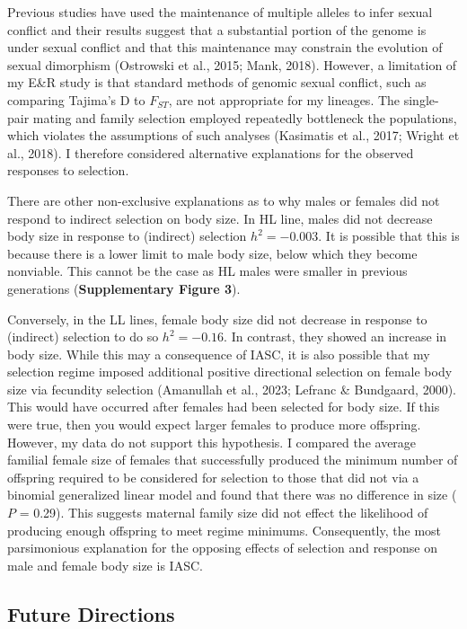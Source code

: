 \documentclass[12pt,reqno,oneside]{report}
\begin{document}
Previous studies have used the maintenance of multiple alleles to infer sexual conflict and their results suggest that a substantial portion of the genome is under sexual conflict and that this maintenance may constrain the evolution of sexual dimorphism (Ostrowski et al., 2015; Mank, 2018). However, a limitation of my E\&R study is that standard methods of genomic sexual conflict, such as comparing Tajima's D to \(F_{ST}\), are not appropriate for my lineages. The single-pair mating and family selection employed repeatedly bottleneck the populations, which violates the assumptions of such analyses (Kasimatis et al., 2017; Wright et al., 2018). I therefore considered alternative explanations for the observed responses to selection.

There are other non-exclusive explanations as to why males or females  did not respond to indirect selection on body size. In HL line, males did not decrease body size in response to (indirect) selection \(h^2 = -0.003\). It is possible that this is because there is a lower limit to male body size, below which they become nonviable. This cannot be the case as HL males were smaller in previous generations (\textbf{Supplementary Figure 3}).

Conversely, in the LL lines, female body size did not decrease in response to (indirect) selection to do so \(h^2 = -0.16\). In contrast, they showed an increase in body size. While this may a consequence of IASC, it is also possible that my selection regime imposed additional positive directional selection on female body size via fecundity selection (Amanullah et al., 2023; Lefranc \& Bundgaard, 2000). This would have occurred after females had been selected for body size. If this were true, then you would expect larger females to produce more offspring. However, my data do not support this hypothesis. I compared the average familial female size of females that successfully produced the minimum number of offspring required to be considered for selection to those that did not via a binomial generalized linear model and found that there was no difference in size ($P$ = 0.29). This suggests maternal family size did not effect the likelihood of producing enough offspring to meet regime minimums. Consequently, the most parsimonious explanation for the opposing effects of selection and response on male and female body size is IASC.

\subsection{Future Directions}
\end{document}
